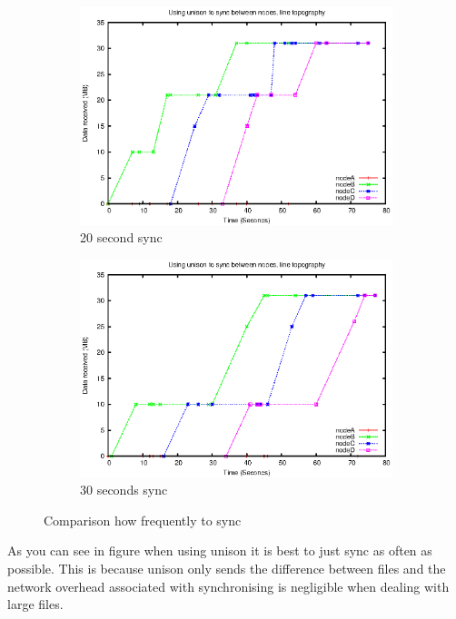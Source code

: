 \documentclass[12pt]{article}
\begin{document}
\begin{figure}[htp]
    \begin{subfigure}[b]{0.5\linewidth}
        \centering
        \includegraphics[scale=0.5]{images/line-uni-10-20.eps}
        \caption{20 second sync}
        \label{fig:line_uni_10_20}
    \end{subfigure}
    \begin{subfigure}[b]{0.5\linewidth}
        \centering
        \includegraphics[scale=0.5]{images/line-uni-10-30.eps}
        \caption{30 seconds sync}
        \label{fig:line_uni_10_30}
    \end{subfigure}
    \caption{Comparison how frequently to sync}
\end{figure}

As you can see in figure 
when using unison it
is best to just sync as often as possible. This is because unison only sends
the difference between files and the network overhead associated with
synchronising is negligible when dealing with large files.
\end{document}
